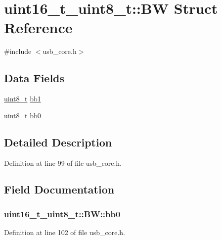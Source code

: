 \hypertarget{structuint16__t__uint8__t_1_1_b_w}{\section{uint16\-\_\-t\-\_\-uint8\-\_\-t\-:\-:B\-W Struct Reference}
\label{structuint16__t__uint8__t_1_1_b_w}
}


{\ttfamily \#include $<$usb\-\_\-core.\-h$>$}

\subsection*{Data Fields}
\begin{DoxyCompactItemize}
\item 
\hyperlink{stdint_8h_aba7bc1797add20fe3efdf37ced1182c5}{uint8\-\_\-t} \hyperlink{structuint16__t__uint8__t_1_1_b_w_a07256d14f7564164013e0dee3a741ab4}{bb1}
\item 
\hyperlink{stdint_8h_aba7bc1797add20fe3efdf37ced1182c5}{uint8\-\_\-t} \hyperlink{structuint16__t__uint8__t_1_1_b_w_a1e10cb6927434e6e46cd76b02b52ad34}{bb0}
\end{DoxyCompactItemize}


\subsection{Detailed Description}


Definition at line 99 of file usb\-\_\-core.\-h.



\subsection{Field Documentation}
\hypertarget{structuint16__t__uint8__t_1_1_b_w_a1e10cb6927434e6e46cd76b02b52ad34}{
\subsubsection[{bb0}]{ uint16\-\_\-t\-\_\-uint8\-\_\-t\-::\-B\-W\-::bb0}}\label{structuint16__t__uint8__t_1_1_b_w_a1e10cb6927434e6e46cd76b02b52ad34}


Definition at line 102 of file usb\-\_\-core.\-h.

